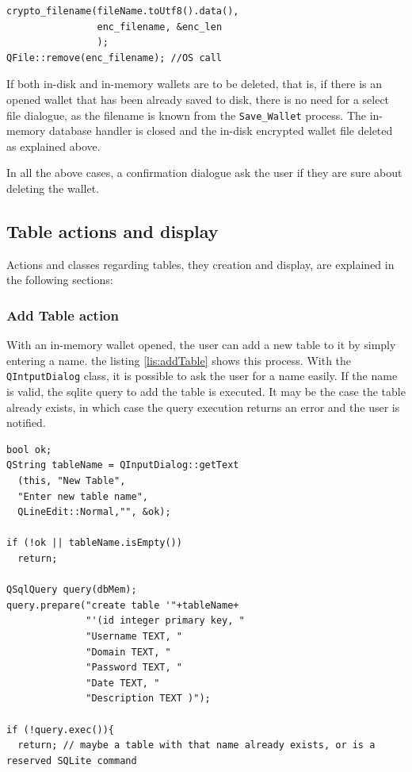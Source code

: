 \begin{lstlisting}[style=customc, float=htb, caption={Delete an in-disk database}, label = {lis:delete}]
crypto_filename(fileName.toUtf8().data(), 
                enc_filename, &enc_len 
                );
QFile::remove(enc_filename); //OS call
\end{lstlisting}

If both in-disk and in-memory wallets are to be deleted, that is, if there is an opened wallet that has been already saved to disk, there is no need for a select file dialogue, as the filename is known from the \texttt{Save\_Wallet} process. The in-memory database handler is closed and the in-disk encrypted wallet file deleted as explained above. 

In all the above cases, a confirmation dialogue ask the user if they are sure about deleting the wallet.

\subsection{Table actions and display}
Actions and classes regarding tables, they creation and display, are explained in the following sections: 

\subsubsection*{Add Table action}

With an in-memory wallet opened, the user can add a new table to it by simply entering a name. the listing \ref{lis:addTable} shows this process. With the \texttt{QIntputDialog} class, it is possible to ask the user for a name easily. If the name is valid, the sqlite query to add the table is executed. It may be the case the table already exists, in which case the query execution returns an error and the user is notified.

\begin{lstlisting}[style=customc, float=htb, caption={Add a New Table}, label = {lis:addTable}]
bool ok;
QString tableName = QInputDialog::getText
  (this, "New Table",
  "Enter new table name",
  QLineEdit::Normal,"", &ok);

if (!ok || tableName.isEmpty())
  return;

QSqlQuery query(dbMem);
query.prepare("create table '"+tableName+
              "'(id integer primary key, "
              "Username TEXT, "
              "Domain TEXT, "
              "Password TEXT, "
              "Date TEXT, "
              "Description TEXT )");

if (!query.exec()){
  return; // maybe a table with that name already exists, or is a reserved SQLite command
\end{lstlisting}

